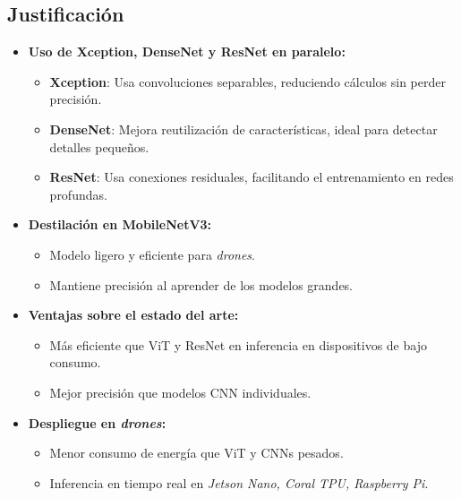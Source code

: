 \subsection{Justificación}

\begin{itemize}
    \item \textbf{Uso de Xception, DenseNet y ResNet en paralelo:}
    \begin{itemize}
        \item \textbf{Xception}: Usa convoluciones separables, reduciendo cálculos sin perder precisión.
        \item \textbf{DenseNet}: Mejora reutilización de características, ideal para detectar detalles pequeños.
        \item \textbf{ResNet}: Usa conexiones residuales, facilitando el entrenamiento en redes profundas.
    \end{itemize}
    \item \textbf{Destilación en MobileNetV3:}
    \begin{itemize}
        \item Modelo ligero y eficiente para \textit{drones}.
        \item Mantiene precisión al aprender de los modelos grandes.
    \end{itemize}
    \item \textbf{Ventajas sobre el estado del arte:}
    \begin{itemize}
        \item Más eficiente que ViT y ResNet en inferencia en dispositivos de bajo consumo.
        \item Mejor precisión que modelos CNN individuales.
    \end{itemize}
    \item \textbf{Despliegue en \textit{drones}:}
    \begin{itemize}
        \item Menor consumo de energía que ViT y CNNs pesados.
        \item Inferencia en tiempo real en \textit{Jetson Nano, Coral TPU, Raspberry Pi}.
    \end{itemize}
\end{itemize}

